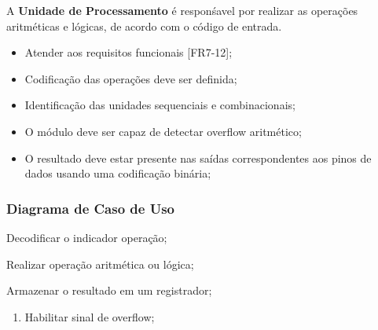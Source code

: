\documentclass{article}
\begin{document}
  A \textbf{Unidade de Processamento} é responśavel por realizar as operações aritméticas e lógicas, de acordo com o código de entrada.
  
  \actors
    \begin{description}
    \end{description}
  
  \preconditions 
    \begin{itemize}
     \item Atender aos requisitos funcionais [FR7-12];
     \item Codificação das operações deve ser definida;
     \item Identificação das unidades sequenciais e combinacionais;
    \end{itemize}

  \postconditions
    \begin{itemize}
     \item O módulo deve ser capaz de detectar overflow aritmético;
     \item O resultado deve estar presente nas saídas correspondentes aos pinos de dados usando uma codificação binária;
    \end{itemize}
  
  \subsubsection*{Diagrama de Caso de Uso}
  
 
  
  \begin{mainflow}
    \item Decodificar o indicador operação;
    \item Realizar operação aritmética ou lógica;
    \item Armazenar o resultado em um registrador;
  \end{mainflow}
  
  \begin{secondaryflow} 
    \begin{enumerate}
      \item Habilitar sinal de overflow;
    \end{enumerate}
  \end{secondaryflow}  
\end{document}

